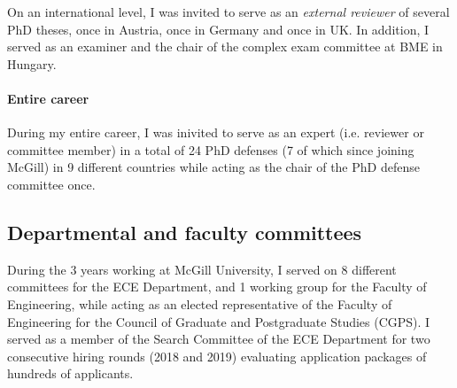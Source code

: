 On an international level, I was invited to serve as an \emph{external reviewer} of several PhD theses, once in Austria, once in Germany and once in UK. In addition, I served as an examiner and the chair of the complex exam committee at BME in Hungary. 

\paragraph{Entire career}
During my entire career, I was inivited to serve as an expert (i.e. reviewer or committee member) in a total of 24 PhD defenses (7 of which since joining McGill) in 9 different countries while acting as the chair of the PhD defense committee once. 

\subsection{Departmental and faculty committees}
During the 3 years working at McGill University, I served on 8 different committees for the ECE Department, and 1 working group for the Faculty of Engineering, while acting as an elected representative of the Faculty of Engineering for the Council of Graduate and Postgraduate Studies (CGPS). I served as a member of the Search Committee of the ECE Department for two consecutive hiring rounds (2018 and 2019) evaluating application packages of hundreds of applicants. 

